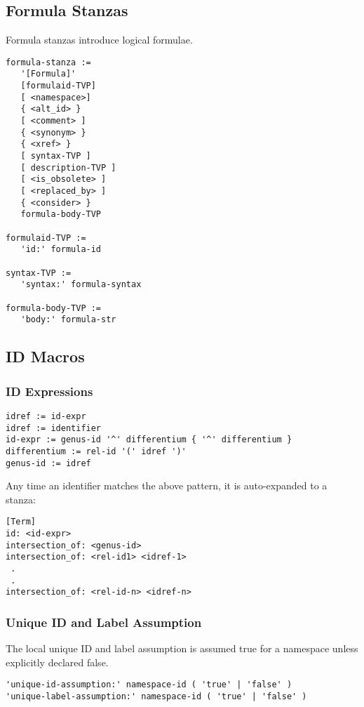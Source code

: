 \subsection{Formula Stanzas}

Formula stanzas introduce logical formulae.

\begin{verbatim}
formula-stanza :=
   '[Formula]'
   [formulaid-TVP]
   [ <namespace>]
   { <alt_id> }
   [ <comment> ]
   { <synonym> }
   { <xref> }
   [ syntax-TVP ]
   [ description-TVP ]
   [ <is_obsolete> ]
   [ <replaced_by> ]
   { <consider> }
   formula-body-TVP

formulaid-TVP :=
   'id:' formula-id

syntax-TVP :=
   'syntax:' formula-syntax

formula-body-TVP :=
   'body:' formula-str

\end{verbatim}

\subsection{ID Macros}

\subsubsection{ID Expressions}

\begin{verbatim}
idref := id-expr
idref := identifier
id-expr := genus-id '^' differentium { '^' differentium }
differentium := rel-id '(' idref ')'
genus-id := idref
\end{verbatim}

Any time an identifier matches the above pattern, it is auto-expanded to a stanza:

\begin{verbatim}
[Term]
id: <id-expr>
intersection_of: <genus-id>
intersection_of: <rel-id1> <idref-1>
 .
 .
intersection_of: <rel-id-n> <idref-n>
\end{verbatim}

\subsubsection{Unique ID and Label Assumption}

The local unique ID and label assumption is assumed true for a namespace unless explicitly declared false.

\begin{verbatim}
'unique-id-assumption:' namespace-id ( 'true' | 'false' )
'unique-label-assumption:' namespace-id ( 'true' | 'false' )
\end{verbatim}


